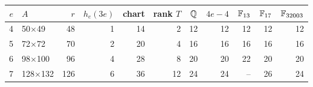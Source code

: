 \begin{tabular}{@{}rlrrrrrrrrr@{}}
\toprule
$e$ & $A$ & $r$ & $h_e(3e)$ & chart & rank $T$ & $\mathbb{Q}$ & $4e-4$ & $\mathbb{F}_{13}$ & $\mathbb{F}_{17}$ & $\mathbb{F}_{32003}$\\
\midrule
4 & 50$\times$49 & 48 & 1 & 14 & 2 & 12 & 12 & 12 & 12 & 12\\
5 & 72$\times$72 & 70 & 2 & 20 & 4 & 16 & 16 & 16 & 16 & 16\\
6 & 98$\times$100 & 96 & 4 & 28 & 8 & 20 & 20 & 22 & 20 & 20\\
7 & 128$\times$132 & 126 & 6 & 36 & 12 & 24 & 24 & -- & 26 & 24\\
\bottomrule
\end{tabular}
